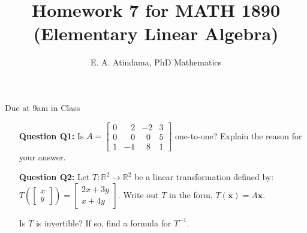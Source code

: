 \documentclass[a4paper,11pt,reqno]{amsart}
\title[MATH 1890 (Elementary Linear Algebra)]{Homework 7 for MATH 1890 (Elementary Linear Algebra)}
\author[Emmanuel Atindama]{E. A. Atindama, PhD Mathematics}
\numberwithin{equation}{section}
\begin{document}
\maketitle
Due at 9am in Class
\vspace{0.5cm}

\begin{enumerate}
    \item[\textbf{Question Q1:}]  Is \(A = \begin{bmatrix}
        0 & \;\;\;2 & -2 & 3\\
        0 & \;\;\;0 & \;\;0 & 5\\
        1 & -4 & \;\; 8 & 1
    \end{bmatrix}\) one-to-one? Explain the reason for your answer.
    \item[\textbf{Question Q2:}]  Let \( T: \mathbb{R}^2 \to \mathbb{R}^2 \) be a linear transformation defined by:
    \(
    T\left(\left[\begin{array}{c} x \\y \end{array}\right]\right) = 
    \left[\begin{array}{c} 2x + 3y\\ x + 4y \end{array}\right].
    \)
    Write out \(T\) in the form, \(T(\mathbf{x}) = A\mathbf{x}.\)
    
    Is \(T\) is invertible? If so, find a formula for \(T^{-1}.\)
\end{enumerate}








\end{document}
